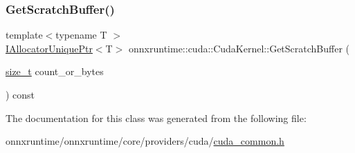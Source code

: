 \subsubsection{\texorpdfstring{Get\+Scratch\+Buffer()}{GetScratchBuffer()}}
{\footnotesize\ttfamily template$<$typename T $>$ \\
\mbox{\hyperlink{namespaceonnxruntime_a323aace024f171700e4b07b299a178e7}{I\+Allocator\+Unique\+Ptr}}$<$T$>$ onnxruntime\+::cuda\+::\+Cuda\+Kernel\+::\+Get\+Scratch\+Buffer (\begin{DoxyParamCaption}\item[{\mbox{\hyperlink{mlasi_8h_a503efbc1c6e50825320ad909366b78ab}{size\+\_\+t}}}]{count\+\_\+or\+\_\+bytes }\end{DoxyParamCaption}) const\hspace{0.3cm}{\ttfamily [inline]}}



The documentation for this class was generated from the following file\+:\begin{DoxyCompactItemize}
\item 
onnxruntime/onnxruntime/core/providers/cuda/\mbox{\hyperlink{cuda__common_8h}{cuda\+\_\+common.\+h}}\end{DoxyCompactItemize}

